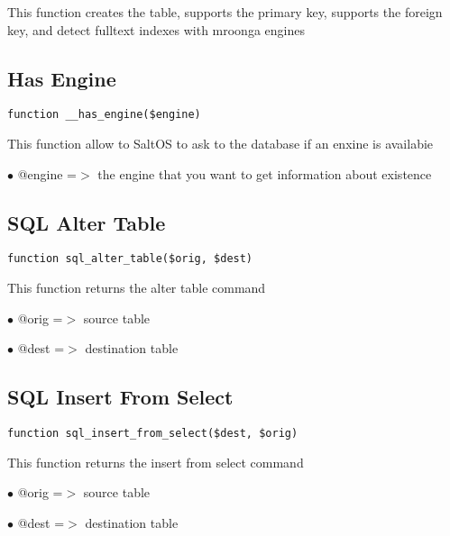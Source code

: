 \documentclass[a4paper]{book}
\begin{document}
This function creates the table, supports the primary key, supports the
foreign key, and detect fulltext indexes with mroonga engines

\hypertarget{toc252}{}
\subsection{Has Engine}

\begin{lstlisting}
function __has_engine($engine)
\end{lstlisting}

This function allow to SaltOS to ask to the database if an enxine is
availabie

\begin{compactitem}
\item[\color{myblue}$\bullet$] @engine =$>$ the engine that you want to get information about existence
\end{compactitem}

\hypertarget{toc253}{}
\subsection{SQL Alter Table}

\begin{lstlisting}
function sql_alter_table($orig, $dest)
\end{lstlisting}

This function returns the alter table command

\begin{compactitem}
\item[\color{myblue}$\bullet$] @orig =$>$ source table
\item[\color{myblue}$\bullet$] @dest =$>$ destination table
\end{compactitem}

\hypertarget{toc254}{}
\subsection{SQL Insert From Select}

\begin{lstlisting}
function sql_insert_from_select($dest, $orig)
\end{lstlisting}

This function returns the insert from select command

\begin{compactitem}
\item[\color{myblue}$\bullet$] @orig =$>$ source table
\item[\color{myblue}$\bullet$] @dest =$>$ destination table
\end{compactitem}
\end{document}
